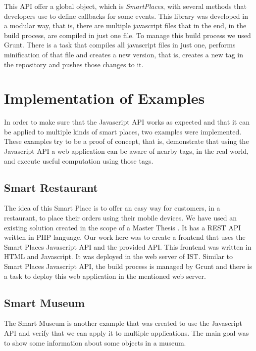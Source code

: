 This \gls{API} offer a global object, which is \emph{SmartPlaces}, with several methods that developers use to define callbacks for some events.
This library was developed in a modular way, that is, there are multiple javascript files that in the end, in the build process, are compiled in just one file.
To manage this build process we used Grunt. There is a task that compiles all javascript files in just one, performs minification of that file and creates a new version, that is, creates a new tag in the repository and pushes those changes to it.

\section{Implementation of Examples}
\label{sec:implementation_examples}
In order to make sure that the Javascript \gls{API} works as expected and that it can be applied to multiple kinds of smart places, two examples were implemented.
These examples try to be a proof of concept, that is, demonstrate that using the Javascript API a web application can be aware of nearby tags, in the real world, and execute useful computation using those tags.

\subsection{Smart Restaurant}
\label{sub:implementation_smart_restaurant}
The idea of this Smart Place is to offer an easy way for customers, in a restaurant, to place their orders using their mobile devices.
We have used an existing solution created in the scope of a Master Thesis \cite{SLOC}.
It has a \gls{REST} \gls{API} written in \gls{PHP} language.
Our work here was to create a frontend that uses the Smart Places Javascript \gls{API} and the provided \gls{API}.
This frontend was written in \gls{HTML} and Javascript.
It was deployed in the web server of \gls{IST}. Similar to Smart Places Javascript \gls{API}, the build process is managed by Grunt and there is a task to deploy this web application in the mentioned web server.

\subsection{Smart Museum}
\label{sub:implementation_smart_museum}
The Smart Museum is another example that was created to use the Javascript \gls{API} and verify that we can apply it to multiple applications.
The main goal was to show some information about some objects in a museum.


